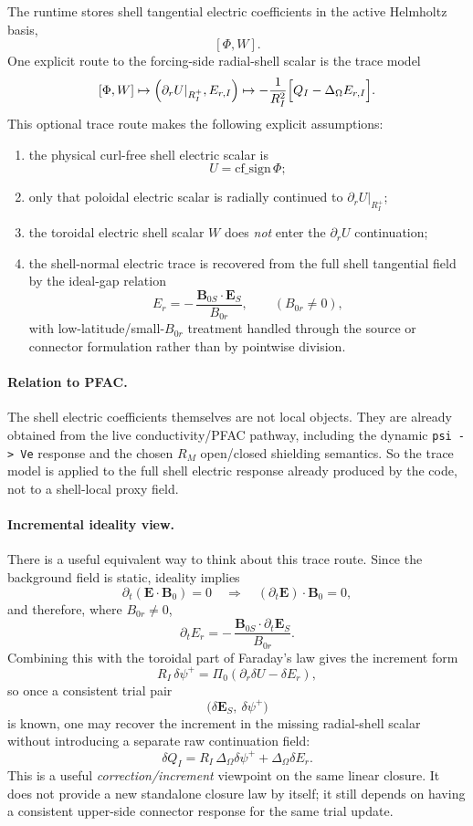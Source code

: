 \documentclass[11pt,a4paper]{article}
\begin{document}
The runtime stores shell tangential electric coefficients in the active
Helmholtz basis,
\[
[\Phi, W].
\]
One explicit route to the forcing-side radial-shell scalar is the trace model
\[
[\Phi, W]
\mapsto
\left(
\partial_r U|_{R_I^+},
E_{r,I}
\right)
\mapsto
-\frac{1}{R_I^2}\Bigl[Q_I - \Delta_\Omega E_{r,I}\Bigr].
\]
This optional trace route makes the following explicit assumptions:
\begin{enumerate}
\item the physical curl-free shell electric scalar is
\[
U = \mathrm{cf\_sign}\,\Phi;
\]
\item only that poloidal electric scalar is radially continued to
$\partial_r U|_{R_I^+}$;
\item the toroidal electric shell scalar $W$ does \emph{not} enter the
$\partial_r U$ continuation;
\item the shell-normal electric trace is recovered from the full shell
tangential field by the ideal-gap relation
\[
E_r = -\,\frac{\mathbf B_{0S}\cdot \mathbf E_S}{B_{0r}},
\qquad
(B_{0r}\neq 0),
\]
with low-latitude/small-\(B_{0r}\) treatment handled through the source or
connector formulation rather than by pointwise division.
\end{enumerate}

\paragraph{Relation to PFAC.}
The shell electric coefficients themselves are not local objects. They are
already obtained from the live conductivity/PFAC pathway, including the dynamic
\texttt{psi -> Ve} response and the chosen $R_M$ open/closed shielding
semantics. So the trace model is applied to the full shell electric response
already produced by the code, not to a shell-local proxy field.

\paragraph{Incremental ideality view.}
There is a useful equivalent way to think about this trace route. Since the
background field is static, ideality implies
\[
\partial_t(\mathbf E\cdot \mathbf B_0)=0
\quad\Longrightarrow\quad
(\partial_t\mathbf E)\cdot \mathbf B_0 = 0,
\]
and therefore, where $B_{0r}\neq 0$,
\[
\partial_t E_r
=
-\,\frac{\mathbf B_{0S}\cdot \partial_t\mathbf E_S}{B_{0r}}.
\]
Combining this with the toroidal part of Faraday's law gives the increment form
\[
R_I\,\delta\psi^+ = \Pi_0(\partial_r \delta U - \delta E_r),
\]
so once a consistent trial pair
\[
\bigl(\delta \mathbf E_S,\ \delta\psi^+\bigr)
\]
is known, one may recover the increment in the missing radial-shell scalar
without introducing a separate raw continuation field:
\[
\delta Q_I
=
R_I\,\Delta_\Omega \delta\psi^+ + \Delta_\Omega \delta E_r.
\]
This is a useful \emph{correction/increment} viewpoint on the same linear
closure. It does not provide a new standalone closure law by itself; it still
depends on having a consistent upper-side connector response for the same trial
update.
\end{document}
